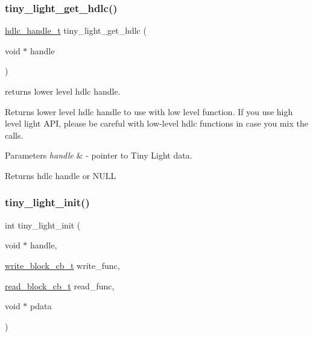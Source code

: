 \subsubsection{\texorpdfstring{tiny\+\_\+light\+\_\+get\+\_\+hdlc()}{tiny\_light\_get\_hdlc()}}
{\footnotesize\ttfamily \hyperlink{group__HDLC__API_gabeaf7578aed5279d3af891bd85a9f961}{hdlc\+\_\+handle\+\_\+t} tiny\+\_\+light\+\_\+get\+\_\+hdlc (\begin{DoxyParamCaption}\item[{void $\ast$}]{handle }\end{DoxyParamCaption})}



returns lower level hdlc handle. 

Returns lower level hdlc handle to use with low level function. If you use high level light A\+PI, please be careful with low-\/level hdlc functions in case you mix the calls.


\begin{DoxyParams}{Parameters}
{\em handle} & -\/ pointer to Tiny Light data. \\
\hline
\end{DoxyParams}
\begin{DoxyReturn}{Returns}
hdlc handle or N\+U\+LL 
\end{DoxyReturn}
\mbox{\label{group__LIGHT__API_ga221cf790724163d1aee89ad6a6c9a14d}} 
\subsubsection{\texorpdfstring{tiny\+\_\+light\+\_\+init()}{tiny\_light\_init()}}
{\footnotesize\ttfamily int tiny\+\_\+light\+\_\+init (\begin{DoxyParamCaption}\item[{void $\ast$}]{handle,  }\item[{\hyperlink{tiny__types_8h_aafd634660bba76cace57a8f9b01e044d}{write\+\_\+block\+\_\+cb\+\_\+t}}]{write\+\_\+func,  }\item[{\hyperlink{tiny__types_8h_a15bec127d9ee63658563d62e92b5261b}{read\+\_\+block\+\_\+cb\+\_\+t}}]{read\+\_\+func,  }\item[{void $\ast$}]{pdata }\end{DoxyParamCaption})}

